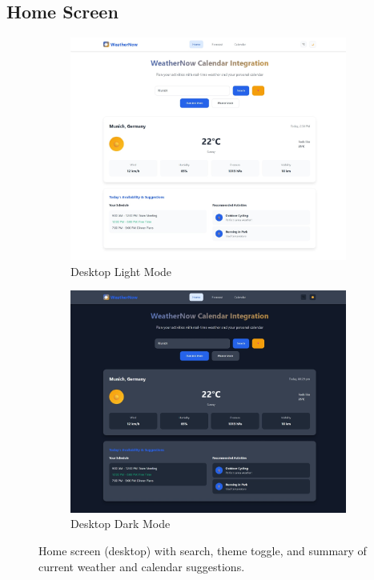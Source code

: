 \documentclass[fontsize=13pt,a4paper]{article}
\begin{document}
\subsection{Home Screen}
\FloatBarrier
\begin{figure}[H]
  \centering
  \begin{subfigure}{0.48\linewidth}
    \includegraphics[width=\linewidth]{home_lightmode.jpeg}
    \caption{Desktop Light Mode}
  \end{subfigure}\hfill
  \begin{subfigure}{0.48\linewidth}
    \includegraphics[width=\linewidth]{home_darkmode.jpeg}
    \caption{Desktop Dark Mode}
  \end{subfigure}
  \caption{Home screen (desktop) with search, theme toggle, and summary of current weather and calendar suggestions.}
  \label{fig:home_desktop}
\end{figure}
\FloatBarrier
\end{document}
